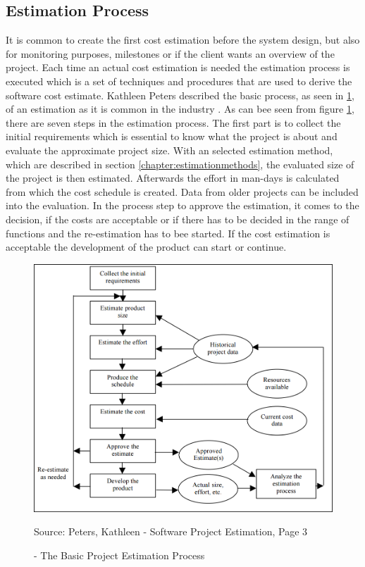 \subsection{Estimation Process}

It is common to create the first cost estimation before the system design, but also for monitoring purposes, milestones or if the client wants an overview of the project. Each time an actual cost estimation is needed the estimation process is executed which is a set of techniques and procedures that are used to derive the software cost estimate. Kathleen Peters described the basic process, as seen in \ref{fig:basicEstimationProcess}, of an estimation as it is common in the industry \cite{estimationProcess}.
As can bee seen from figure \ref{fig:basicEstimationProcess}, there are seven steps in the estimation process. The first part is to collect the initial requirements which is essential to know what the project is about and evaluate the approximate project size. With an selected estimation method, which are described in section \ref{chapter:estimationmethods}, the evaluated size of the project is then estimated. Afterwards the effort in man-days is calculated from which the cost schedule is created. Data from older projects can be included into the evaluation. In the process step to approve the estimation, it comes to the decision, if the costs are acceptable or if there has to be decided in the range of functions and the re-estimation has to bee started. If the cost estimation is acceptable the development of the product can start or continue.\\
\begin{figure}[h] 
	\centering 
	\includegraphics[width=13cm]{images/estimationProcess.PNG} 
	\caption{- The Basic Project Estimation Process}
	Source: Peters, Kathleen - Software Project Estimation, Page 3  
	\label{fig:basicEstimationProcess}
\end{figure}\\
